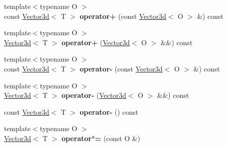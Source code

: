 \begin{DoxyCompactItemize}
\item 
\mbox{\label{classenhance_1_1Vector3d_ab17dc155ecc52dfdaffa162882c6e679}} 
{\footnotesize template$<$typename O $>$ }\\const \mbox{\hyperlink{classenhance_1_1Vector3d}{Vector3d}}$<$ T $>$ {\bfseries operator+} (const \mbox{\hyperlink{classenhance_1_1Vector3d}{Vector3d}}$<$ O $>$ \&) const
\item 
\mbox{\label{classenhance_1_1Vector3d_aa3bac62d54a54ee8ff03cd5e61975af2}} 
{\footnotesize template$<$typename O $>$ }\\\mbox{\hyperlink{classenhance_1_1Vector3d}{Vector3d}}$<$ T $>$ {\bfseries operator+} (\mbox{\hyperlink{classenhance_1_1Vector3d}{Vector3d}}$<$ O $>$ \&\&) const
\item 
\mbox{\label{classenhance_1_1Vector3d_a11e2f814fc5525552f3f24396ac2eb60}} 
{\footnotesize template$<$typename O $>$ }\\const \mbox{\hyperlink{classenhance_1_1Vector3d}{Vector3d}}$<$ T $>$ {\bfseries operator-\/} (const \mbox{\hyperlink{classenhance_1_1Vector3d}{Vector3d}}$<$ O $>$ \&) const
\item 
\mbox{\label{classenhance_1_1Vector3d_ada6850e861c6a2b3df35432661b900e5}} 
{\footnotesize template$<$typename O $>$ }\\\mbox{\hyperlink{classenhance_1_1Vector3d}{Vector3d}}$<$ T $>$ {\bfseries operator-\/} (\mbox{\hyperlink{classenhance_1_1Vector3d}{Vector3d}}$<$ O $>$ \&\&) const
\item 
\mbox{\label{classenhance_1_1Vector3d_a0358f0479f1b1b3a1505b2da742ddecb}} 
const \mbox{\hyperlink{classenhance_1_1Vector3d}{Vector3d}}$<$ T $>$ {\bfseries operator-\/} () const
\item 
\mbox{\label{classenhance_1_1Vector3d_ae5e2225d3ed23344ba10a7f1756ba77b}} 
{\footnotesize template$<$typename O $>$ }\\\mbox{\hyperlink{classenhance_1_1Vector3d}{Vector3d}}$<$ T $>$ {\bfseries operator$\ast$=} (const O \&)
\item 
\mbox{\label{classenhance_1_1Vector3d_a4371b92a35eceb24bfe633c36726e878}} 

\end{DoxyCompactItemize}

